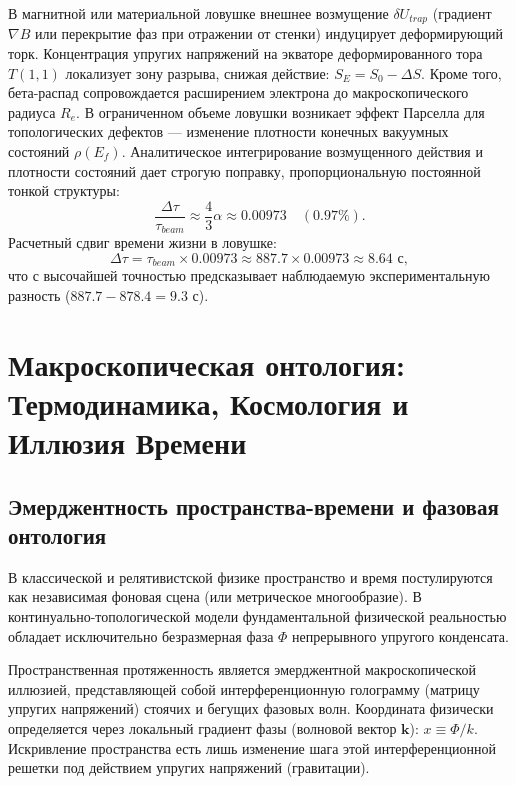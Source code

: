 \documentclass[12pt,a4paper]{article}
\begin{document}
В магнитной или материальной ловушке внешнее возмущение $\delta U_{trap}$ (градиент $\nabla B$ или перекрытие фаз при отражении от стенки) индуцирует деформирующий торк. Концентрация упругих напряжений на экваторе деформированного тора $T(1,1)$ локализует зону разрыва, снижая действие: $S_E = S_0 - \Delta S$.
Кроме того, бета-распад сопровождается расширением электрона до макроскопического радиуса $R_e$. В ограниченном объеме ловушки возникает эффект Парселла для топологических дефектов — изменение плотности конечных вакуумных состояний $\rho(E_f)$. Аналитическое интегрирование возмущенного действия и плотности состояний дает строгую поправку, пропорциональную постоянной тонкой структуры:
\begin{equation}
\frac{\Delta \tau}{\tau_{beam}} \approx \frac{4}{3} \alpha \approx 0.00973 \quad (0.97\%).
\end{equation}
Расчетный сдвиг времени жизни в ловушке:
\begin{equation}
\Delta \tau = \tau_{beam} \times 0.00973 \approx 887.7 \times 0.00973 \approx 8.64 \text{ с},
\end{equation}
что с высочайшей точностью предсказывает наблюдаемую экспериментальную разность ($887.7 - 878.4 = 9.3$ с).


\section{Макроскопическая онтология: Термодинамика, Космология и Иллюзия Времени}

\subsection{Эмерджентность пространства-времени и фазовая онтология}
В классической и релятивистской физике пространство и время постулируются как независимая фоновая сцена (или метрическое многообразие). В континуально-топологической модели фундаментальной физической реальностью обладает исключительно безразмерная фаза $\Phi$ непрерывного упругого конденсата. 

Пространственная протяженность является эмерджентной макроскопической иллюзией, представляющей собой интерференционную голограмму (матрицу упругих напряжений) стоячих и бегущих фазовых волн. Координата физически определяется через локальный градиент фазы (волновой вектор $\mathbf{k}$): $x \equiv \Phi / k$. Искривление пространства есть лишь изменение шага этой интерференционной решетки под действием упругих напряжений (гравитации).
\end{document}
